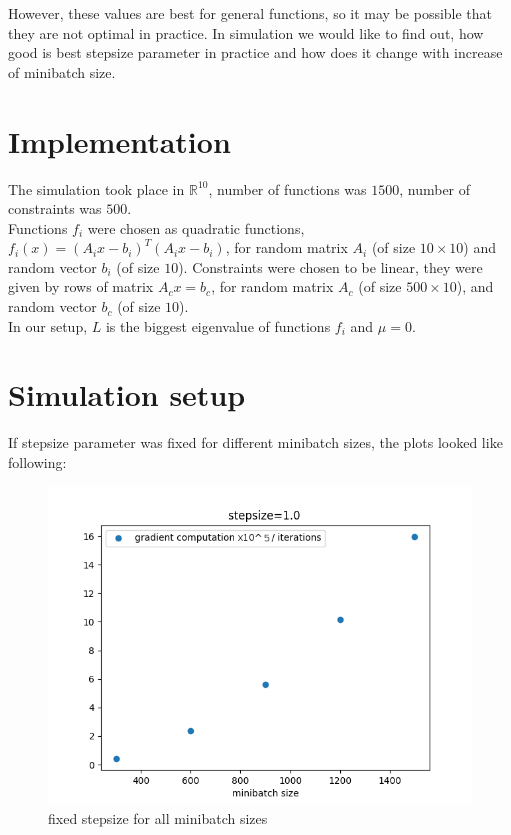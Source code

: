 \documentclass[11pt]{book}
\newcommand{\R}{\mathbb{R}}
\begin{document}
However, these values are best for general functions, so it may be possible that they are not optimal in practice. In simulation we would like to find out, how good is best stepsize parameter in practice and how does it change with increase of minibatch size.


\section{Implementation}

The simulation took place in $\R^{10}$, number of functions was $1500$, number of constraints was $500$.\\

Functions $f_i$ were chosen as quadratic functions, $f_i(x) = (A_ix-b_i)^T(A_ix-b_i)$, for random matrix $A_i$ (of size $10 \times 10$) and random vector $b_i$ (of size $10$). Constraints were chosen to be linear, they were given by rows of matrix $A_cx=b_c$, for random matrix $A_c$ (of size $500 \times 10$), and random vector $b_c$ (of size $10$).\\

In our setup, $L$ is the biggest eigenvalue of functions $f_i$ and $\mu=0$.

\section{Simulation setup}

If stepsize parameter was fixed for different minibatch sizes, the plots looked like following:

\begin{figure}[H]
	\centering
	\includegraphics[width=.7\linewidth]{fixed_stepsize.png}
	\caption{fixed stepsize for all minibatch sizes}
	\label{fig:fixed stepsize}
\end{figure}
\end{document}
